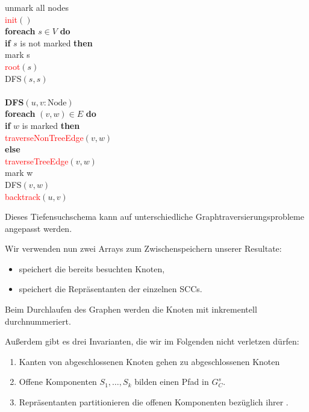 \begin{pseudocode}
  unmark all nodes \\
  \textcolor{red}{init}\( () \) \\
  \textbf{foreach} \( s \in V \) \textbf{do} \\
  \phantom{\enskip} \textbf{if} \( s \) is not marked \textbf{then} \\
  \phantom{\enskip} \phantom{\enskip} mark s \\
  \phantom{\enskip} \phantom{\enskip} \textcolor{red}{root}\( (s) \) \\
  \phantom{\enskip} \phantom{\enskip} DFS\( (s,s) \) \\
  \enskip{} \\
  \textbf{\textsc{DFS}}\( (u,v : \text{Node}) \) \\
  \phantom{\enskip} \textbf{foreach} \( (v,w) \in E \) \textbf{do} \\
  \phantom{\enskip} \phantom{\enskip} \textbf{if} \( w \) is marked \textbf{then} \\ \phantom{\enskip} \phantom{\enskip} \phantom{\enskip} \textcolor{red}{traverseNonTreeEdge}\( (v,w) \) \\
  \phantom{\enskip} \phantom{\enskip} \textbf{else} \\
  \phantom{\enskip} \phantom{\enskip} \phantom{\enskip} \textcolor{red}{traverseTreeEdge}\( (v,w) \) \\
  \phantom{\enskip} \phantom{\enskip} \phantom{\enskip} mark w \\
  \phantom{\enskip} \phantom{\enskip} \phantom{\enskip} DFS\( (v,w) \) \\
  \phantom{\enskip} \textcolor{red}{backtrack}\( (u,v) \)
\end{pseudocode}

Dieses Tiefensuchschema kann auf unterschiedliche Graphtraversierungsprobleme angepasst werden.

Wir verwenden nun zwei Arrays zum Zwischenspeichern unserer Resultate:
\begin{itemize}
  \item {} speichert die bereits besuchten Knoten,
  \item {} speichert die Repräsentanten der einzelnen SCCs.
\end{itemize}

Beim Durchlaufen des Graphen werden die Knoten mit  inkrementell durchnummeriert.

Außerdem gibt es drei Invarianten, die wir im Folgenden nicht verletzen dürfen:
\begin{enumerate}
  \item Kanten von abgeschlossenen Knoten gehen zu abgeschlossenen Knoten
  \item Offene Komponenten \( S_1,\dots,S_k \) bilden einen Pfad in \( G_C^s \).
  \item Repräsentanten partitionieren die offenen Komponenten bezüglich ihrer .
\end{enumerate}

